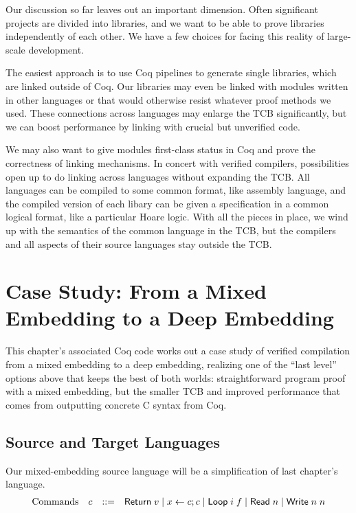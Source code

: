 \documentclass{amsbook}
\theoremstyle{definition}
\theoremstyle{remark}
\numberwithin{section}{chapter}
\numberwithin{equation}{chapter}
\begin{document}
\modularity
Our discussion so far leaves out an important dimension.
Often significant projects are divided into libraries, and we want to be able to prove libraries independently of each other.
We have a few choices for facing this reality of large-scale development.

The easiest approach is to use Coq pipelines to generate single libraries, which are linked outside of Coq.
Our libraries may even be linked with modules written in other languages or that would otherwise resist whatever proof methods we used.
These connections across languages may enlarge the TCB significantly, but we can boost performance by linking with crucial but unverified code.

We may also want to give modules first-class status in Coq and prove the correctness of linking mechanisms.
In concert with verified compilers, possibilities open up to do linking across languages without expanding the TCB.
All languages can be compiled to some common format, like assembly language, and the compiled version of each libary can be given a specification in a common logical format, like a particular Hoare logic.
With all the pieces in place, we wind up with the semantics of the common language in the TCB, but the compilers and all aspects of their source languages stay outside the TCB.


\section{Case Study: From a Mixed Embedding to a Deep Embedding}

This chapter's associated Coq code works out a case study of verified compilation from a mixed embedding to a deep embedding, realizing one of the ``last level'' options above that keeps the best of both worlds: straightforward program proof with a mixed embedding, but the smaller TCB and improved performance that comes from outputting concrete C syntax from Coq.

\subsection{Source and Target Languages}

Our mixed-embedding source language will be a simplification of last chapter's language.
$$\begin{array}{rrcl}
  \textrm{Commands} & c &::=& \mathsf{Return} \; v \mid x \leftarrow c; c \mid \mathsf{Loop} \; i \; f \mid \mathsf{Read} \; n \mid \mathsf{Write} \; n \; n
\end{array}$$
\end{document}
